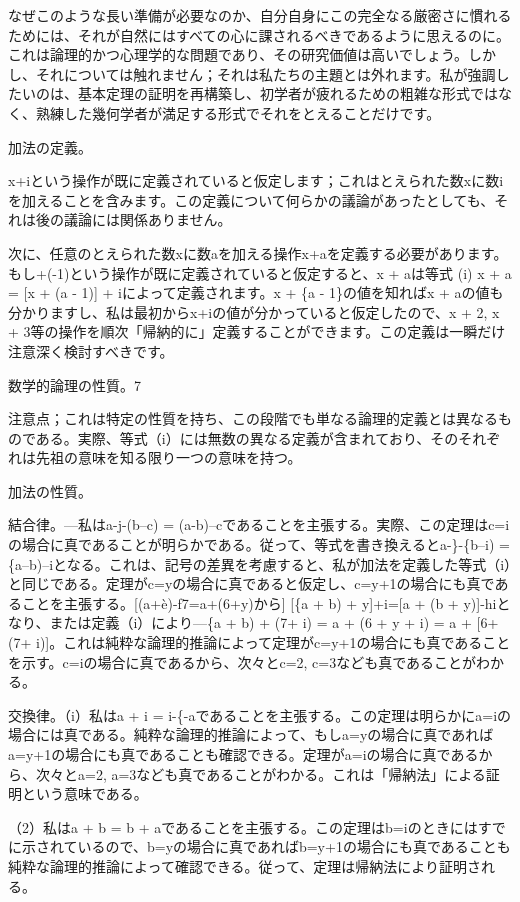 \documentclass[a4paper,11pt,openany]{ltjsbook}
\begin{document}
なぜこのような長い準備が必要なのか、自分自身にこの完全なる厳密さに慣れるためには、それが自然にはすべての心に課されるべきであるように思えるのに。これは論理的かつ心理学的な問題であり、その研究価値は高いでしょう。しかし、それについては触れません；それは私たちの主題とは外れます。私が強調したいのは、基本定理の証明を再構築し、初学者が疲れるための粗雑な形式ではなく、熟練した幾何学者が満足する形式でそれをとえることだけです。

加法の定義。

x+iという操作が既に定義されていると仮定します；これはとえられた数xに数iを加えることを含みます。この定義について何らかの議論があったとしても、それは後の議論には関係ありません。

次に、任意のとえられた数xに数aを加える操作x+aを定義する必要があります。もし+(-1)という操作が既に定義されていると仮定すると、x + aは等式 (i) x + a = [x + (a - 1)] + iによって定義されます。x + \{a - 1\}の値を知ればx + aの値も分かりますし、私は最初からx+iの値が分かっていると仮定したので、x + 2, x + 3等の操作を順次「帰納的に」定義することができます。この定義は一瞬だけ注意深く検討すべきです。

数学的論理の性質。7

注意点；これは特定の性質を持ち、この段階でも単なる論理的定義とは異なるものである。実際、等式（i）には無数の異なる定義が含まれており、そのそれぞれは先祖の意味を知る限り一つの意味を持つ。

加法の性質。

結合律。—私はa-j-(b--c) = (a-b)--cであることを主張する。実際、この定理はc=iの場合に真であることが明らかである。従って、等式を書き換えるとa-\}-\{b--i) = \{a--b)--iとなる。これは、記号の差異を考慮すると、私が加法を定義した等式（i）と同じである。定理がc=yの場合に真であると仮定し、c=y+1の場合にも真であることを主張する。[(a+è)-f7=a+(6+y)から] [\{a + b) + y]+i=[a + (b + y)]-hiとなり、または定義（i）により—\{a + b) + (7+ i) = a + (6 + y + i) = a + [6+ (7+ i)]。これは純粋な論理的推論によって定理がc=y+1の場合にも真であることを示す。c=iの場合に真であるから、次々とc=2, c=3なども真であることがわかる。

交換律。（i）私はa + i = i-\{-aであることを主張する。この定理は明らかにa=iの場合には真である。純粋な論理的推論によって、もしa=yの場合に真であればa=y+1の場合にも真であることも確認できる。定理がa=iの場合に真であるから、次々とa=2, a=3なども真であることがわかる。これは「帰納法」による証明という意味である。

（2）私はa + b = b + aであることを主張する。この定理はb=iのときにはすでに示されているので、b=yの場合に真であればb=y+1の場合にも真であることも純粋な論理的推論によって確認できる。従って、定理は帰納法により証明される。
\end{document}
